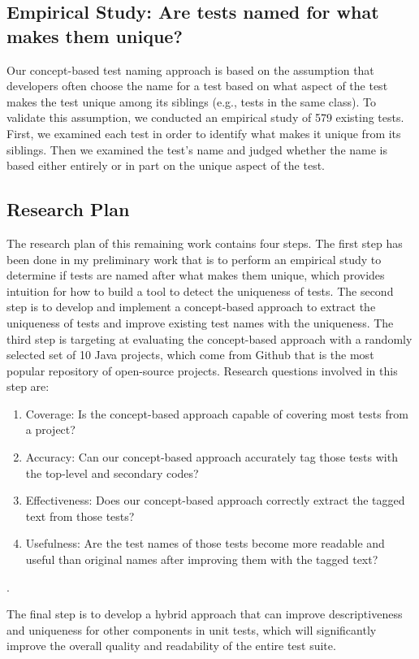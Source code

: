 \documentclass[proposal.tex]{subfiles}
\begin{document}
\subsection{Empirical Study: Are tests named for what makes them unique?}
\label{sec:unique-test-name}

Our concept-based test naming approach is based on the assumption that developers often choose the name for a test based on what aspect of the test makes the test unique among its siblings (e.g., tests in the same class).
%
To validate this assumption, we conducted an empirical study of \num{579} existing tests.
%
First, we examined each test in order to identify what makes it unique from its siblings.
%
Then we examined the test's name and judged whether the name is based either entirely or in part on the unique aspect of the test.

\subsection{Research Plan}

The research plan of this remaining work contains four steps.
%
The first step has been done in my preliminary work that is to perform an empirical study to determine if tests are named after what makes them unique, which provides intuition for how to build a tool to detect the uniqueness of tests.
%
The second step is to develop and implement a concept-based approach to extract the uniqueness of tests and improve existing test names with the uniqueness.
%
The third step is targeting at evaluating the concept-based approach with a randomly selected set of \num{10} Java projects, which come from Github that is the most popular repository of open-source projects.
%
Research questions involved in this step are:
\begin{enumerate}
    \item Coverage: Is the concept-based approach capable of covering most tests from a project?
    \item Accuracy: Can our concept-based approach accurately tag those tests with the top-level and secondary codes?
    \item Effectiveness: Does our concept-based approach correctly extract the tagged text from those tests?
    \item Usefulness: Are the test names of those tests become more readable and useful than original names after improving them with the tagged text?
\end{enumerate}.

The final step is to develop a hybrid approach that can improve descriptiveness and uniqueness for other components in unit tests, which will significantly improve the overall quality and readability of the entire test suite.
\end{document}
